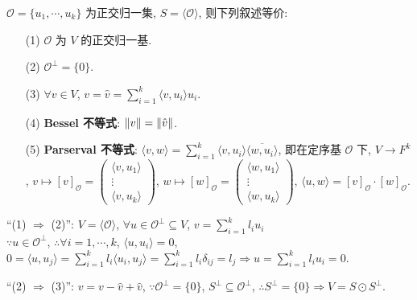 \documentclass{note}
\begin{document}
\begin{thm}
    $\mathcal{O}=\{u_1,\cdots,u_k\}$ 为正交归一集, $S=\langle\mathcal{O}\rangle$, 则下列叙述等价:
    \begin{itemize}
        \item[(1)] $\mathcal{O}$ 为 $V$ 的正交归一基.
        \item[(2)] $\mathcal{O}^{\perp}=\{0\}$.
        \item[(3)] $\forall v\in V$, $v=\hat{v}=\sum_{i=1}^k\langle v,u_i\rangle u_i$.
        \item[(4)] \textbf{Bessel 不等式}: $\left\lVert v\right\rVert=\left\lVert\hat{v}\right\rVert$.
        \item[(5)] \textbf{Parserval 不等式}: $\langle v,w\rangle=\sum_{i=1}^k\langle v,u_i\rangle\overline{\langle w,u_i\rangle}$, 即在定序基 $\mathcal{O}$ 下, $V\rightarrow F^k$, $v\mapsto[v]_{\mathcal{O}}=\begin{pmatrix}
            \langle v,u_1\rangle\\
            \vdots\\
            \langle v,u_k\rangle
        \end{pmatrix}$, $w\mapsto[w]_{\mathcal{O}}=\begin{pmatrix}
            \langle w,u_1\rangle\\
            \vdots\\
            \langle w,u_k\rangle
        \end{pmatrix}$, $\langle u,w\rangle=[v]_{\mathcal{O}}\cdot[w]_{\mathcal{O}}$.
    \end{itemize}
\end{thm}
\begin{pf}
    ``(1) $\Longrightarrow$ (2)'': $V=\langle\mathcal{O}\rangle$, $\forall u\in\mathcal{O}^{\perp}\subseteq V$, $v=\sum_{i=1}^kl_iu_i$\\
    $\because u\in\mathcal{O}^{\perp}$, $\therefore\forall i=1,\cdots,k$, $\langle u,u_i\rangle=0$,\\
    $0=\langle u,u_j\rangle=\sum_{i=1}^kl_i\langle u_i,u_j\rangle=\sum_{i=1}^kl_i\delta_{ij}=l_j\Longrightarrow u=\sum_{i=1}^kl_iu_i=0$.

    ``(2) $\Longrightarrow$ (3)'': $v=v-\hat{v}+\hat{v}$, $\because\mathcal{O}^{\perp}=\{0\}$, $S^{\perp}\subseteq\mathcal{O}^{\perp}$, $\therefore S^{\perp}=\{0\}\Longrightarrow V=S\odot S^{\perp}$.

\end{pf}
\end{document}
